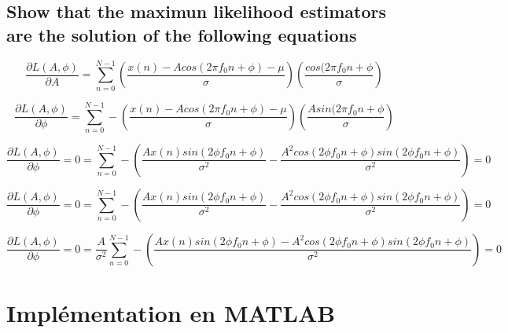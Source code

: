 \documentclass{report}
\begin{document}
\section{Show that the maximun likelihood estimators are the solution of the following equations}

\begin{equation}\label{key}
\frac{\partial L(A,\phi)}{\partial A} = \sum_{n=0}^{N-1} (\frac{x(n) - A cos (2\pi f_0 n + \phi)-\mu}{\sigma})(\frac{cos(2\pi f_0 n +\phi}{\sigma})
\end{equation}

\begin{equation}\label{key}
\frac{\partial L(A,\phi)}{\partial \phi} = \sum_{n=0}^{N-1} - (\frac{x(n) - A cos (2\pi f_0 n + \phi)-\mu}{\sigma})(\frac{Asin(2\pi f_0 n +\phi}{\sigma})
\end{equation}


\begin{equation}\label{key}
\frac{\partial L(A,\phi)}{\partial \phi} = 0 = \sum_{n=0}^{N-1} - (\frac{Ax(n)sin(2\phi f_0 n +\phi)}{\sigma^2}-\frac{A^2cos(2\phi f_0 n +\phi)sin(2\phi f_0 n +\phi)}{\sigma^2}) = 0
\end{equation}


\begin{equation}\label{key}
\frac{\partial L(A,\phi)}{\partial \phi} = 0 = \sum_{n=0}^{N-1} - (\frac{Ax(n)sin(2\phi f_0 n +\phi)}{\sigma^2}-\frac{A^2cos(2\phi f_0 n +\phi)sin(2\phi f_0 n +\phi)}{\sigma^2}) = 0
\end{equation}

\begin{equation}\label{key}
\frac{\partial L(A,\phi)}{\partial \phi} = 0 = \frac{A}{\sigma^2} \sum_{n=0}^{N-1} - (\frac{Ax(n)sin(2\phi f_0 n +\phi)-A^2cos(2\phi f_0 n +\phi)sin(2\phi f_0 n +\phi)}{\sigma^2}) = 0
\end{equation}












\chapter{Implémentation en MATLAB{\small \circledR}}
\end{document}
